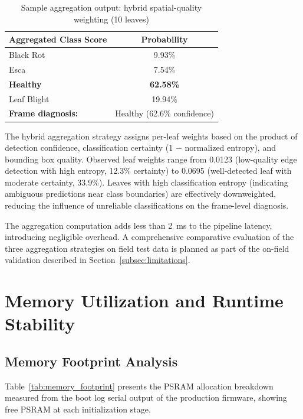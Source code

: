 \begin{table}[htbp]
\centering
\caption{Sample aggregation output: hybrid spatial-quality weighting (10 leaves)}
\label{tab:aggregation_sample}
\begin{tabular}{lc}
\toprule
\textbf{Aggregated Class Score} & \textbf{Probability} \\
\midrule
Black Rot       & 9.93\% \\
Esca            & 7.54\%  \\
\textbf{Healthy}& \textbf{62.58\%} \\
Leaf Blight     & 19.94\% \\
\midrule
\textbf{Frame diagnosis:} & Healthy (62.6\% confidence) \\
\bottomrule
\end{tabular}
\end{table}

The hybrid aggregation strategy assigns per-leaf weights based on the product of detection confidence, classification certainty (1 $-$ normalized entropy), and bounding box quality. Observed leaf weights range from 0.0123 (low-quality edge detection with high entropy, 12.3\% certainty) to 0.0695 (well-detected leaf with moderate certainty, 33.9\%). Leaves with high classification entropy (indicating ambiguous predictions near class boundaries) are effectively downweighted, reducing the influence of unreliable classifications on the frame-level diagnosis.

The aggregation computation adds less than 2~ms to the pipeline latency, introducing negligible overhead. A comprehensive comparative evaluation of the three aggregation strategies on field test data is planned as part of the on-field validation described in Section~\ref{subsec:limitations}.


\section{Memory Utilization and Runtime Stability}
\label{sec:memory_utilization}

\subsection*{Memory Footprint Analysis}
\label{subsec:memory_footprint}

Table~\ref{tab:memory_footprint} presents the PSRAM allocation breakdown measured from the boot log serial output of the production firmware, showing free PSRAM at each initialization stage.

